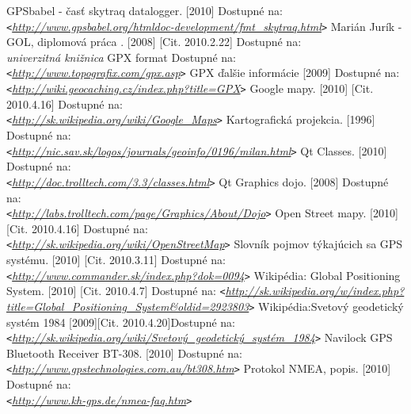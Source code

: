 
\begin{thebibliography}{99}
GPSbabel - časť skytraq datalogger. [2010] Dostupné na: \\
\verb|<|\emph{\url{http://www.gpsbabel.org/htmldoc-development/fmt\_skytraq.html}}\verb|>|
Marián Jurík - GOL, diplomová práca . [2008] [Cit. 2010.2.22] Dostupné na:\\
\emph{univerzitná knižnica}
GPX format   Dostupné na: \\
\verb|<|\emph{\url{http://www.topografix.com/gpx.asp}}\verb|>|
GPX ďalšie informácie [2009] Dostupné na: \\
\verb|<|\emph{\url{http://wiki.geocaching.cz/index.php?title=GPX}}\verb|>|
Google mapy. [2010] [Cit. 2010.4.16] Dostupné na: \\
\verb|<|\emph{\url{http://sk.wikipedia.org/wiki/Google\_Maps}}\verb|>|
Kartografická projekcia. [1996] Dostupné na: \\
\verb|<|\emph{\url{http://nic.sav.sk/logos/journals/geoinfo/0196/milan.html}}\verb|>|
Qt Classes. [2010] Dostupné na: \\
\verb|<|\emph{\url{http://doc.trolltech.com/3.3/classes.html}}\verb|>|
Qt Graphics dojo. [2008] Dostupné na:\\
\verb|<|\emph{\url{http://labs.trolltech.com/page/Graphics/About/Dojo}}\verb|>|
Open Street mapy. [2010] [Cit. 2010.4.16] Dostupné na: \\
\verb|<|\emph{\url{http://sk.wikipedia.org/wiki/OpenStreetMap}}\verb|>|
Slovník pojmov týkajúcich sa GPS systému. [2010] [Cit. 2010.3.11] Dostupné na: 
\verb|<|\emph{\url{http://www.commander.sk/index.php?dok=0094}}\verb|>|
 Wikipédia: Global Positioning System. [2010] [Cit. 2010.4.7] Dostupné na: \verb|<|\emph{\url{http://sk.wikipedia.org/w/index.php?title=Global_Positioning_System&oldid=2923803}}\verb|>|
Wikipédia:Svetový geodetický systém 1984 [2009][Cit. 2010.4.20]Dostupné na: \verb|<|\emph{\url{http://sk.wikipedia.org/wiki/Svetový\_geodetický\_systém\_1984}}\verb|>|
Navilock GPS Bluetooth Receiver BT-308. [2010] Dostupné na: 
\verb|<|\emph{\url{http://www.gpstechnologies.com.au/bt308.htm}}\verb|>|
Protokol NMEA, popis. [2010] Dostupné na: \\
\verb|<|\emph{\url{http://www.kh-gps.de/nmea-faq.htm}}\verb|>|


\end{thebibliography}
